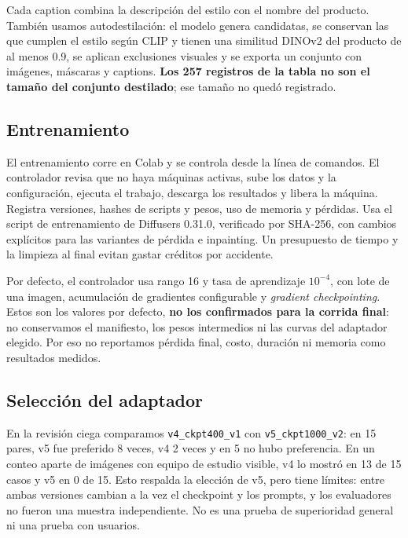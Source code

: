 \documentclass[11pt,a4paper]{article}
\begin{document}
Cada caption combina la descripción del estilo con el nombre del producto. También usamos autodestilación: el modelo genera candidatas, se conservan las que cumplen el estilo según CLIP y tienen una similitud DINOv2 del producto de al menos 0.9, se aplican exclusiones visuales y se exporta un conjunto con imágenes, máscaras y captions. \textbf{Los 257 registros de la tabla no son el tamaño del conjunto destilado}; ese tamaño no quedó registrado.

\subsection{Entrenamiento}
El entrenamiento corre en Colab y se controla desde la línea de comandos. El controlador revisa que no haya máquinas activas, sube los datos y la configuración, ejecuta el trabajo, descarga los resultados y libera la máquina. Registra versiones, hashes de scripts y pesos, uso de memoria y pérdidas. Usa el script de entrenamiento de Diffusers 0.31.0, verificado por SHA-256, con cambios explícitos para las variantes de pérdida e inpainting. Un presupuesto de tiempo y la limpieza al final evitan gastar créditos por accidente.

Por defecto, el controlador usa rango 16 y tasa de aprendizaje $10^{-4}$, con lote de una imagen, acumulación de gradientes configurable y \emph{gradient checkpointing}. Estos son los valores por defecto, \textbf{no los confirmados para la corrida final}: no conservamos el manifiesto, los pesos intermedios ni las curvas del adaptador elegido. Por eso no reportamos pérdida final, costo, duración ni memoria como resultados medidos.

\subsection{Selección del adaptador}
En la revisión ciega comparamos \texttt{v4\_ckpt400\_v1} con \texttt{v5\_ckpt1000\_v2}: en 15 pares, v5 fue preferido 8 veces, v4 2 veces y en 5 no hubo preferencia. En un conteo aparte de imágenes con equipo de estudio visible, v4 lo mostró en 13 de 15 casos y v5 en 0 de 15. Esto respalda la elección de v5, pero tiene límites: entre ambas versiones cambian a la vez el checkpoint y los prompts, y los evaluadores no fueron una muestra independiente. No es una prueba de superioridad general ni una prueba con usuarios.

\clearpage
\end{document}
